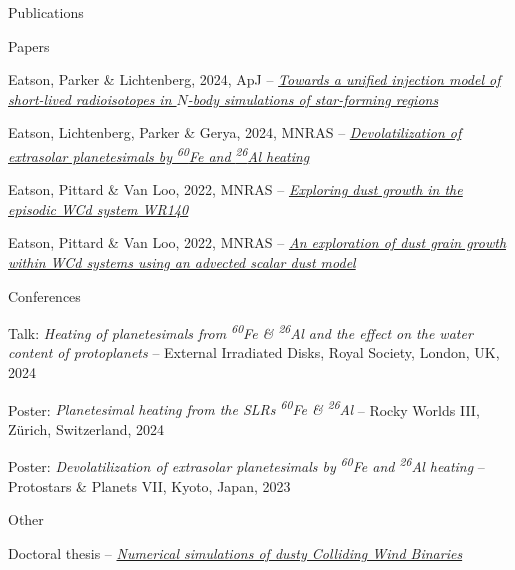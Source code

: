\documentclass{resume} %
\begin{document}
\begin{rSection}{Publications}
	\begin{rPoints}{Papers}
		\item {Eatson, Parker \& Lichtenberg, 2024, ApJ} -- {\href{https://iopscience.iop.org/article/10.3847/1538-4357/ad8642}{\sl Towards a unified injection model of short-lived radioisotopes in $N$-body simulations of star-forming regions}}
		\item {Eatson, Lichtenberg, Parker \& Gerya, 2024, MNRAS} -- \href{https://ui.adsabs.harvard.edu/abs/2024MNRAS.528.6619E/abstract}{\sl Devolatilization of extrasolar planetesimals by \textsuperscript{60}Fe and \textsuperscript{26}Al heating} 
		\item {Eatson, Pittard \& Van Loo, 2022, MNRAS} -- {\href{https://ui.adsabs.harvard.edu/abs/2022MNRAS.517.4705E/abstract}{\sl Exploring dust growth in the episodic WCd system WR140}}
		\item {Eatson, Pittard \& Van Loo, 2022, MNRAS} -- {\sl \href{https://ui.adsabs.harvard.edu/abs/2022MNRAS.516.6132E/abstract}{An exploration of dust grain growth within WCd systems using an advected scalar dust model}}
	\end{rPoints}
	\begin{rPoints}{Conferences}
		\item {Talk: \sl Heating of planetesimals from \textsuperscript{60}Fe \& \textsuperscript{26}Al and the effect on the water content of protoplanets} -- External Irradiated Disks, Royal Society, London, UK, 2024
		\item {Poster: \sl Planetesimal heating from the SLRs \textsuperscript{60}Fe \& \textsuperscript{26}Al} -- Rocky Worlds III, Z{\"u}rich, Switzerland, 2024
		\item Poster: {\sl Devolatilization of extrasolar planetesimals by \textsuperscript{60}Fe and \textsuperscript{26}Al heating} --  Protostars \& Planets VII, Kyoto, Japan, 2023
	\end{rPoints}
	\begin{rPoints}{Other}
		\item {Doctoral thesis -- \href{https://etheses.whiterose.ac.uk/32292/}{\sl Numerical simulations of dusty Colliding Wind Binaries}} 
	\end{rPoints}
\end{rSection}

\end{document}

